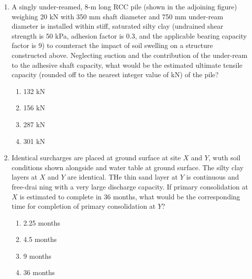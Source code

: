 \documentclass[journal,12pt,onecolumn]{IEEEtran}
\theoremstyle{remark}
\begin{document}
\begin{enumerate}
\item A singly under-reamed, 8-m long RCC pile (shown in the adjoining figure) weighing 20 kN with 350 mm shaft diameter and 750 mm under-ream diameter is installed within stiff, saturated silty clay (undrained shear strength is 50 kPa, adhesion factor is 0.3, and the applicable bearing capacity factor is 9) to counteract the impact of soil swelling on a structure constructed above. Neglecting suction and the contribution of the under-ream to the adhesive shaft capacity, what would be the estimated ultimate tensile capacity (rounded off to the nearest integer value of kN) of the pile?
\begin{figure}[ht]
\centering

\end{figure}
	\begin{multicols}{4}
	\begin{enumerate}
		\item 132 kN
		\item 156 kN
		\item 287 kN
		\item 301 kN
	\end{enumerate}
	\end{multicols}

\item Identical surcharges are placed at ground surface at site $X$ and $Y$, wuth soil conditions shown alongside and water table at ground surface. The silty clay layers at $X$ and $Y$ are identical. THe thin sand layer at $Y$ is continuous and free-drai ning with a very large discharge capacity. If primary consolidation at $X$ is estimated to complete in 36 months, what would be the corresponding time for completion of primary consolidation at $Y$?
\begin{figure}[ht]
\centering

\end{figure}
	\begin{multicols}{4}
	\begin{enumerate}
		\item 2.25 months
		\item 4.5 months
		\item 9 months
		\item 36 months
	\end{enumerate}
	\end{multicols}


\end{enumerate}
\end{document}
